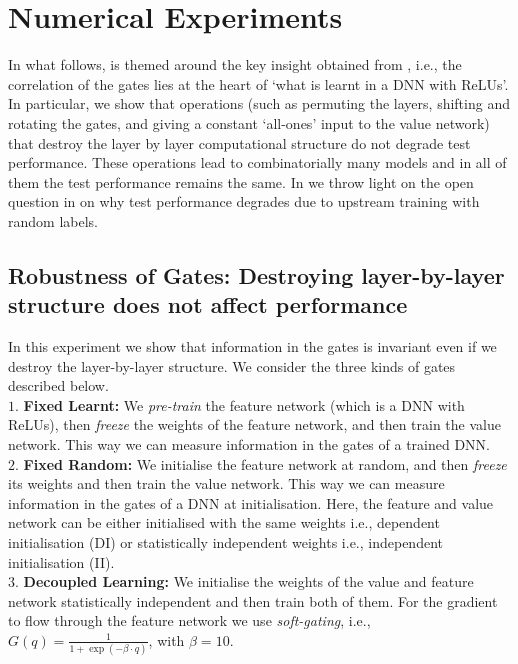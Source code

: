 \section{Numerical Experiments}\label{sec:exp} 
In what follows,  is themed around the key insight obtained from , i.e., the correlation of the gates lies at the heart of `what is learnt in a DNN with ReLUs'. In particular, we show that operations (such as permuting the layers, shifting and rotating the gates, and giving a constant `all-ones' input to the value network) that destroy the layer by layer computational structure do not degrade test performance. These operations lead to combinatorially many models and in all of them the test performance remains the same. In  we throw light on the open question in  on why test performance degrades due to upstream training with random labels.
\subsection{Robustness of Gates: Destroying layer-by-layer structure does not affect performance}\label{sec:exp1}
In this experiment we show that information in the gates is invariant even if we destroy the layer-by-layer structure. We consider the three kinds of gates described below.\\
\indent \quad$1.$ \textbf{Fixed Learnt:} We \emph{pre-train} the feature network (which is a DNN with ReLUs), then \emph{freeze} the weights of the feature network, and then train the value network. This way we can measure information in the gates of a trained DNN.\\
\indent \quad$2.$ \textbf{Fixed Random:} We initialise the feature network at random, and then \emph{freeze} its weights and then train the value network. This way we can measure information in the gates of a DNN at initialisation. Here, the feature and value network can be either initialised with the same weights i.e., dependent initialisation (DI) or statistically independent weights  i.e., independent initialisation (II).\\
\indent \quad$3.$ \textbf{Decoupled Learning:} We initialise the weights of the value and feature network statistically independent and then train both of them. For the gradient to flow through the feature network we use \emph{soft-gating}, i.e., $G(q)=\frac{1}{1+\exp({-\beta\cdot q})}$, with $\beta=10$. 

